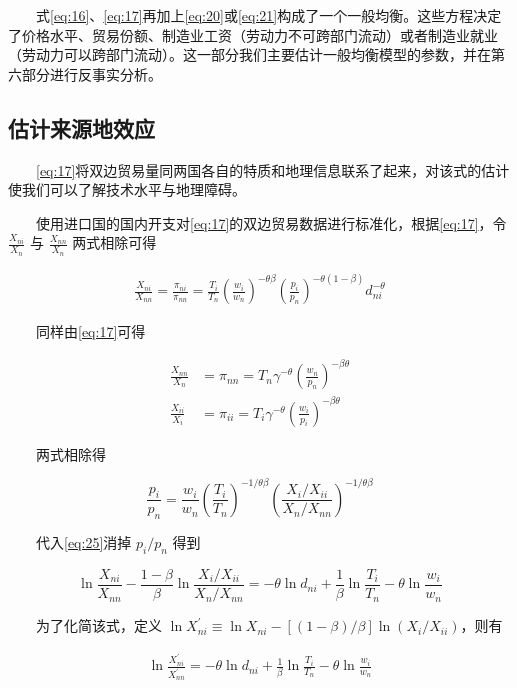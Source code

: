 \documentclass[
]{article}
\begin{document}
　　式\eqref{eq:16}、\eqref{eq:17}再加上\eqref{eq:20}或\eqref{eq:21}构成了一个一般均衡。这些方程决定了价格水平、贸易份额、制造业工资（劳动力不可跨部门流动）或者制造业就业（劳动力可以跨部门流动）。这一部分我们主要估计一般均衡模型的参数，并在第六部分进行反事实分析。

\hypertarget{ux4f30ux8ba1ux6765ux6e90ux5730ux6548ux5e94}{%
\subsection{估计来源地效应}\label{ux4f30ux8ba1ux6765ux6e90ux5730ux6548ux5e94}}

　　\eqref{eq:17}将双边贸易量同两国各自的特质和地理信息联系了起来，对该式的估计使我们可以了解技术水平与地理障碍。

　　使用进口国的国内开支对\eqref{eq:17}的双边贸易数据进行标准化，根据\eqref{eq:17}，令 \(\frac{X_{ni}}{X_n}\) 与 \(\frac{X_{nn}}{X_n}\) 两式相除可得

\begin{align}
\frac{X_{n i}}{X_{n n}}=\frac{\pi_{n i}}{\pi_{n n}}=\frac{T_{i}}{T_{n}}\left(\frac{w_{i}}{w_{n}}\right)^{-\theta \beta}\left(\frac{p_{i}}{p_{n}}\right)^{-\theta(1-\beta)} d_{n i}^{-\theta} \label{eq:25}
\end{align}

　　同样由\eqref{eq:17}可得

\[
\begin{aligned}
\frac{X_{n n}}{X_{n}}&=\pi_{n n}=T_{n}\gamma^{-\theta}\left(\frac{w_{n}}{p_{n}}\right)^{-\beta\theta } \\
\frac{X_{i i}}{X_{i}}&=\pi_{i i}=T_{i}\gamma^{-\theta}\left(\frac{w_{i}}{p_{i}}\right)^{-\beta\theta } 
\end{aligned}
\]

　　两式相除得

\[
\frac{p_{i}}{p_{n}}=\frac{w_{i}}{w_{n}}\left(\frac{T_{i}}{T_{n}}\right)^{-1 / \theta \beta}\left(\frac{X_{i} / X_{i i}}{X_{n} / X_{n n}}\right)^{-1 / \theta \beta}
\]

　　代入\eqref{eq:25}消掉 \({p_i}/{p_n}\) 得到

\[
\ln \frac{X_{n i}}{X_{n n}}-\frac{1-\beta}{\beta}\ln \frac{X_{i} / X_{i i}}{X_{n} / X_{n n}}=-\theta \ln d_{n i}+\frac{1}{\beta} \ln \frac{T_{i}}{T_{n}}-\theta \ln \frac{w_{i}}{w_{n}}
\]

　　为了化简该式，定义 \(\ln X_{n i}^{\prime} \equiv \ln X_{ni}-[(1-\beta)/\beta] \ln (X_i/X_{ii})\)，则有

\begin{align}
\ln \frac{X_{n i}^{\prime}}{X_{n n}^{\prime}}=-\theta \ln d_{n i}+\frac{1}{\beta} \ln \frac{T_{i}}{T_{n}}-\theta \ln \frac{w_{i}}{w_{n}} \label{eq:26}
\end{align}
\end{document}

